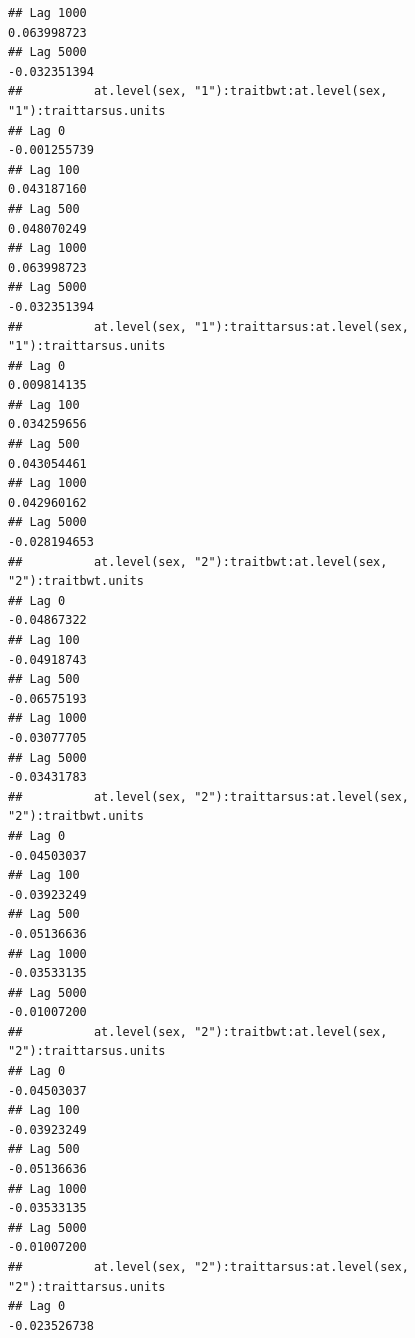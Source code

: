 \documentclass[
  12pt,
]{book}
\begin{document}
\begin{verbatim}
## Lag 1000                                                      0.063998723
## Lag 5000                                                     -0.032351394
##          at.level(sex, "1"):traitbwt:at.level(sex, "1"):traittarsus.units
## Lag 0                                                        -0.001255739
## Lag 100                                                       0.043187160
## Lag 500                                                       0.048070249
## Lag 1000                                                      0.063998723
## Lag 5000                                                     -0.032351394
##          at.level(sex, "1"):traittarsus:at.level(sex, "1"):traittarsus.units
## Lag 0                                                            0.009814135
## Lag 100                                                          0.034259656
## Lag 500                                                          0.043054461
## Lag 1000                                                         0.042960162
## Lag 5000                                                        -0.028194653
##          at.level(sex, "2"):traitbwt:at.level(sex, "2"):traitbwt.units
## Lag 0                                                      -0.04867322
## Lag 100                                                    -0.04918743
## Lag 500                                                    -0.06575193
## Lag 1000                                                   -0.03077705
## Lag 5000                                                   -0.03431783
##          at.level(sex, "2"):traittarsus:at.level(sex, "2"):traitbwt.units
## Lag 0                                                         -0.04503037
## Lag 100                                                       -0.03923249
## Lag 500                                                       -0.05136636
## Lag 1000                                                      -0.03533135
## Lag 5000                                                      -0.01007200
##          at.level(sex, "2"):traitbwt:at.level(sex, "2"):traittarsus.units
## Lag 0                                                         -0.04503037
## Lag 100                                                       -0.03923249
## Lag 500                                                       -0.05136636
## Lag 1000                                                      -0.03533135
## Lag 5000                                                      -0.01007200
##          at.level(sex, "2"):traittarsus:at.level(sex, "2"):traittarsus.units
## Lag 0                                                           -0.023526738

\end{verbatim}
\end{document}
